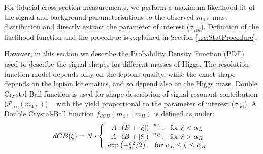 For fiducial cross section measurements, we perform a maximum likelihood fit of the signal and background parameterisations to the observed $m_{4\ell}$ mass distribution and directly extract the parameter of interest ($\sigma{}_{fid}$). Definition of the likelihood function and the procedrue is explained in Section \ref{sec:StatProcedure}.

%
%
However, in this section we describe the Probability Density Function (PDF) used to describe the signal shapes
for different masses of Higgs.
The resolution function model depends only on the leptons quality, while the exact
shape depends on the lepton kinematics, and so depend also on the Higgs mass. 
Double Crystal Ball function is used for shape description of signal resonant contribution ($\mathcal{P}_{\mathrm{res}}(m_{4\ell})$) ~\cite{Chatrchyan:2013mxa} with the yield proportional to the
parameter of interest ($\sigma_{\mathrm{fid}}$).
A Double
Crystal-Ball function $f_{dCB}(m_{4\ell} \, | \, m_{H})$ is defined as under:
%
\begin{equation}
dCB(\xi ) = N \cdot \left\{ {\begin{array}{*{20}c}
   { A \cdot \left( B  + |\xi | \right)^{- n_L } ,  {\rm{      \,\,\,\,   for \,\, }} \xi  < \alpha_L }  \\
   { A \cdot \left( B  + |\xi | \right)^{- n_R } ,  {\rm{      \,\,\,\,   for \,\, }} \xi  > \alpha_R }  \\
   {\exp \left( - \xi ^2  / 2 \right) ,            {\rm{      \,\,\,\,   for  \,\, }} \alpha_L \leq \xi  \leq \alpha_R }  \\
\end{array}} \right.
\label{eq:dCB}
\end{equation}
%

